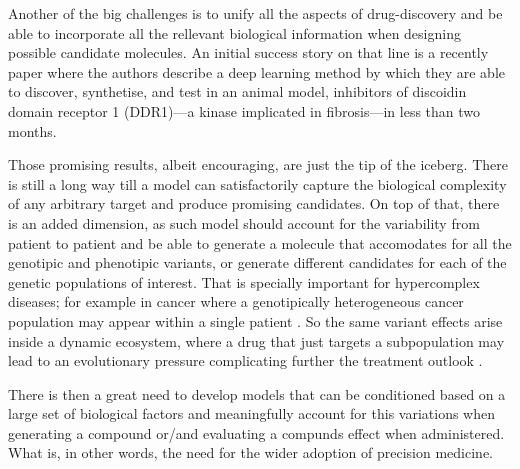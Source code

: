 \documentclass{article}
\begin{document}


Another of the big challenges is to unify all the aspects of drug-discovery and be able
 to incorporate all the rellevant biological information when designing possible
 candidate molecules. An initial success story on that line is a recently paper
 \cite{Zhavoronkov2019} where the authors describe a deep learning method by which they
 are able to discover, synthetise, and test in an animal model, inhibitors of discoidin
 domain receptor 1 (DDR1)—a kinase implicated in fibrosis—in less than two months.

Those promising results, albeit encouraging, are just the tip of the iceberg. There is
still a long way till a model can satisfactorily capture the biological complexity of
any arbitrary target and produce promising candidates. On top of that, there is an added
dimension, as such model should account for the variability from patient to patient and
be able to generate a molecule that accomodates for all the genotipic and phenotipic
variants, or generate different candidates for each of the genetic populations of
interest. That is specially important for hypercomplex diseases; for example in cancer
where a genotipically heterogeneous cancer population may appear within a single patient
\cite{Boland2017}. So the same variant effects arise inside a dynamic ecosystem, where a
drug that just targets a subpopulation may lead to an evolutionary pressure complicating
further the treatment outlook \cite{Enriquez-Navas2015}.

There is then a great need to develop models that can be conditioned based on a large
set of biological factors and meaningfully account for this variations when generating a
compound or/and evaluating a compunds effect when administered. What is, in other
words, the need for the wider adoption of precision medicine.
\end{document}
